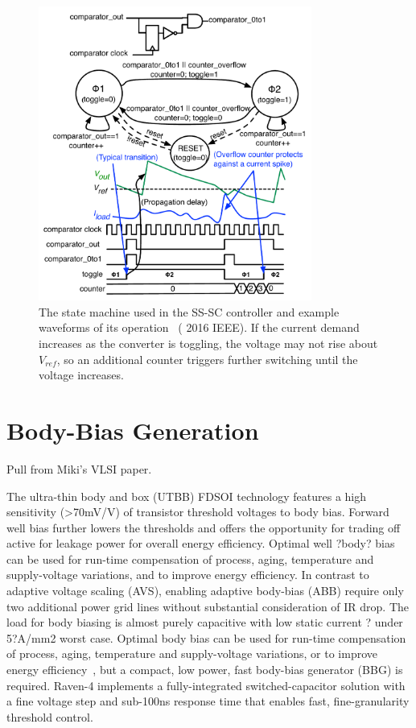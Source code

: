 \documentclass[graybox]{svmult}
\begin{document}
\begin{figure}
  \centering
  \includegraphics[width=0.8\textwidth]{3-dcdc-state-machine}
  \caption{The state machine used in the SS-SC controller and example waveforms of its operation~\cite{Zimmer2016} ({\textcopyright} 2016 IEEE).  If the current demand increases as the converter is toggling, the voltage may not rise about $V_{ref}$, so an additional counter triggers further switching until the voltage increases.}
  \label{fig:3-dcdc-state-machine}
\end{figure}

\section{Body-Bias Generation}
Pull from Miki's VLSI paper.


The ultra-thin body and box (UTBB) FDSOI technology features a high sensitivity (>70mV/V) of transistor threshold voltages to body bias.
Forward well bias further lowers the thresholds and offers the opportunity for trading off active for leakage power for overall energy efficiency. Optimal well ?body? bias can be used for run-time compensation of process, aging, temperature and supply-voltage variations, and to improve energy efficiency.
In contrast to adaptive voltage scaling (AVS), enabling adaptive body-bias (ABB) require only two additional power grid lines without substantial consideration of IR drop.
The load for body biasing is almost purely capacitive with low static current ? under 5?A/mm2 worst case.
Optimal body bias can be used for run-time compensation of process, aging, temperature and supply-voltage variations, or to improve energy efficiency~\cite{Tschanz2002}, but a compact, low power, fast body-bias generator (BBG) is required.
Raven-4 implements a fully-integrated switched-capacitor solution with a fine voltage step and sub-100ns response time that enables fast, fine-granularity threshold control.
\end{document}
